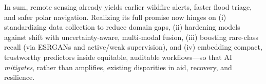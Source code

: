 \documentclass[conference,a4paper]{IEEEtran}
\begin{document}
In sum, remote sensing already yields earlier wildfire alerts, faster flood triage, and safer polar navigation. Realizing its full promise now hinges on (i) standardizing data collection to reduce domain gaps, (ii) hardening models against shift with uncertainty-aware, multi-modal fusion, (iii) boosting rare-class recall (via ESRGANs and active/weak supervision), and (iv) embedding compact, trustworthy predictors inside equitable, auditable workflows---so that AI \emph{mitigates}, rather than amplifies, existing disparities in aid, recovery, and resilience.




  
\end{document}
